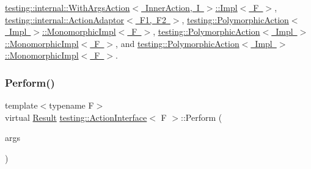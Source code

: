 \mbox{\hyperlink{classtesting_1_1internal_1_1_with_args_action_1_1_impl_a4b01eaaab6fc8dab3cec31991cf79766}{testing\+::internal\+::\+With\+Args\+Action$<$ Inner\+Action, I $>$\+::\+Impl$<$ F $>$}}, \mbox{\hyperlink{classtesting_1_1internal_1_1_action_adaptor_a8d8a47a31f068cf6e0c95b91605d5540}{testing\+::internal\+::\+Action\+Adaptor$<$ F1, F2 $>$}}, \mbox{\hyperlink{classtesting_1_1_polymorphic_action_1_1_monomorphic_impl_af657293ae1ac638802c0fd2486ee5f5b}{testing\+::\+Polymorphic\+Action$<$ Impl $>$\+::\+Monomorphic\+Impl$<$ F $>$}}, \mbox{\hyperlink{classtesting_1_1_polymorphic_action_1_1_monomorphic_impl_ae532b81e7689e0677d64c81f500f3c15}{testing\+::\+Polymorphic\+Action$<$ Impl $>$\+::\+Monomorphic\+Impl$<$ F $>$}}, and \mbox{\hyperlink{classtesting_1_1_polymorphic_action_1_1_monomorphic_impl_ae532b81e7689e0677d64c81f500f3c15}{testing\+::\+Polymorphic\+Action$<$ Impl $>$\+::\+Monomorphic\+Impl$<$ F $>$}}.

\mbox{\label{classtesting_1_1_action_interface_a20f8624fcea1786f2992b358760422a0}} 
\subsubsection{\texorpdfstring{Perform()}{Perform()}\hspace{0.1cm}{\footnotesize\ttfamily [3/3]}}
{\footnotesize\ttfamily template$<$typename F$>$ \\
virtual \mbox{\hyperlink{classtesting_1_1_action_interface_a7477de2fe3e4e01c59db698203acaee7}{Result}} \mbox{\hyperlink{classtesting_1_1_action_interface}{testing\+::\+Action\+Interface}}$<$ F $>$\+::Perform (\begin{DoxyParamCaption}\item[{const \mbox{\hyperlink{classtesting_1_1_action_interface_af72720d864da4d606629e83edc003511}{Argument\+Tuple}} \&}]{args }\end{DoxyParamCaption})\hspace{0.3cm}{\ttfamily [pure virtual]}}



